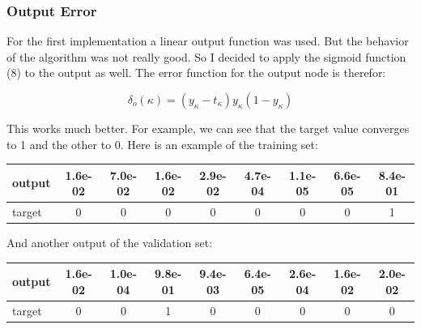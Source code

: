 \documentclass[10pt,a4paper]{article}
\begin{document}
  	\subsubsection{Output Error}
  	For the first implementation a linear output function was used. But the behavior of the algorithm was not really good. So I decided to apply the sigmoid function (8) to the output as well. The error function for the output node is therefor: \\
  	\begin{center}
  		\begin{equation}
  		\delta_o (\kappa) = (y_{\kappa}-t_{\kappa})y_{\kappa}(1-y_{\kappa})  
  		\end{equation} 
  	\end{center}
  	This works much better. For example, we can see that the target value converges to 1 and the other to 0. Here is an example of the training set: \\
  	\begin{center}
  			\begin{center}
  			\begin{tabular}{|l|c|c|c|c|c|c|c|c|}
  				\hline
  				output&	1.6e-02& 7.0e-02 & 1.6e-02 & 2.9e-02 & 4.7e-04 & 1.1e-05 & 6.6e-05& 8.4e-01\\ 
  				\hline
  				target&0&0  &0  &0  &0  &0  &0  &1 \\
  				\hline
  			\end{tabular}		
  		\end{center}
  	\end{center}
  	And another output of the validation set: \\
  	\begin{center}
  			\begin{tabular}{|l|c|c|c|c|c|c|c|c|}
  				\hline
  				output&1.6e-02& 1.0e-04 & 9.8e-01 & 9.4e-03 & 6.4e-05 & 2.6e-04 & 1.6e-02 & 2.0e-02\\ 
  				\hline
  				target&0&0  &1  &0  &0  &0  &0  &0 \\
  				\hline
  			\end{tabular}		
  	\end{center}
  	
\end{document}
